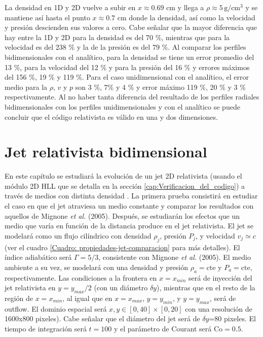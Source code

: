 \documentclass[12pt,a4paper]{book}
\begin{document}
La densidad en 1D y 2D vuelve a subir
en $x \approx 0.69$ cm y llega a $\rho \approx 5 \,  \text{g}/ \text{cm}^3$ y 
se mantiene así hasta el punto $x \approx 0.7$ cm 
donde la densidad, así como la velocidad y presión descienden sus valores a cero.
Cabe señalar que la mayor diferencia que hay entre la 1D y 2D para la densidad es del 70 \%, mientras que para la 
velocidad es del 238 \% y la de la presión es del 79 \%.
Al comparar los perfiles bidimensionales con el analítico, para la densidad se tiene un error promedio del
13 \%, para la velocidad del 12 \% y para la presión del 16 \% y errores máximos del 156 \%, 19 \% y 119 \%. 
Para el caso unidimensional con el analítico, el error medio para la $\rho$, $v$ y $p$ son 
3 \%,  7\% y  4 \% y error máximo 119 \%, 20 \% y 3 \% respectivamente.
Al no haber tanta diferencia del resultado de los perfiles radiales bidimensionales con 
los perfiles unidimensionales y con el analítico se puede concluir que el código relativista es válido
en una y dos dimensiones.





\chapter{Jet relativista bidimensional}

En este capítulo se estudiará la evolución de un jet 2D relativista (usando el módulo 2D HLL que se detalla en la 
sección \ref{cap:Verificacion_del_codigo}) a {\color {red} través de medios con distinta densidad }. 
La primera prueba consistirá en estudiar el caso en que el jet atraviesa un 
medio constante y  comparar los resultados con aquellos de Mignone \emph{et al.} (2005). 
Después, se estudiarán los efectos que un {\color {red} medio que varía en función de la distancia} produce en el jet relativista.
El jet se modelará como un flujo cilíndrico con densidad $\rho_j$, presión $P_j$,  y velocidad $v_j \simeq c$ 
{\color {red} (ver el cuadro \ref{Cuadro: propiedades-jet-comparacion} para más detalles)}. El índice adiabático será $\Gamma = 5/3$, 
consistente con Mignone \emph{et al.} (2005). El medio ambiente a su vez, se modelará con una densidad y presión $\rho_a = \mathrm{cte}$ y $P_a = \mathrm{cte}$, 
respectivamente. Las condiciones a la frontera en $x=x_{min}$ será de inyección del jet relativista en $y= y_{max}/2$ (con un diámetro $\delta y$), mientras que en el resto de la región de $x=x_{min}$, al igual que en $x=x_{max}$, $y=y_{min}$, y $y=y_{max}$, será de outflow. El dominio espacial será $x, y \in [0,40]\times[0,20]$ con una resolución de {\color {red} 1600x800} pixeles). Cabe señalar que el diámetro del jet será de $\delta y$=80 pixeles. El tiempo de integración será $t = 100$  y el parámetro de Courant será $\text{Co} = 0.5$.
\end{document}

